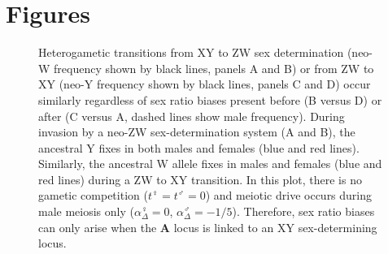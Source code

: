 \documentclass[12pt]{article}
\begin{document}



\newpage
\section*{Figures}

\begin{figure}[!h]
\centering
{}
\caption{
Heterogametic transitions from XY to ZW sex determination (neo-W frequency shown by black lines, panels A and B) or from ZW to XY (neo-Y frequency shown by black lines, panels C and D) occur similarly regardless of sex ratio biases present before (B versus D) or after (C versus A, dashed lines show male frequency). 
During invasion by a neo-ZW sex-determination system (A and B), the ancestral Y fixes in both males and females (blue and red lines). 
Similarly, the ancestral W allele fixes in males and females (blue and red lines) during a ZW to XY transition. 
In this plot, there is no gametic competition ($t^\female=t^\male=0$) and meiotic drive occurs during male meiosis only ($\alpha^\female_{\Delta}=0$, $\alpha^\male_{\Delta}=-1/5$). Therefore, sex ratio biases can only arise when the \textbf{A} locus is linked to an XY sex-determining locus.
}
\end{figure}
\end{document}

